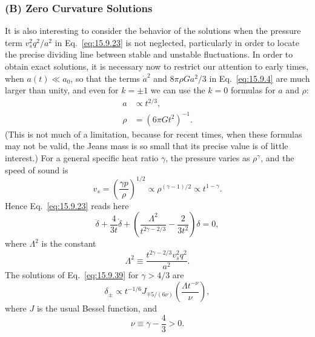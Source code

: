 \subsubsection*{(B) Zero Curvature Solutions}

It is also interesting to consider the behavior of the solutions when the
pressure term \(v_s^2q^2/a^2\) in Eq.~\eqref{eq:15.9.23} is not neglected,
particularly in order to locate the precise dividing line between stable and
unstable fluctuations. In order to obtain exact solutions, it is necessary now
to restrict our attention to early times, when \(a(t)\ll a_0\), so that the
terms \(\dot a^2\) and \(8\pi\rho Ga^2/3\) in Eq.~\eqref{eq:15.9.4} are
much larger than unity, and even for \(k=\pm1\) we can use the \(k=0\)
formulas for \(a\) and \(\rho\):
\begin{align}
  a&\propto t^{2/3},
  \tag{15.9.36}\label{eq:15.9.36}\\
  \rho&=(6\pi Gt^2)^{-1}.
  \tag{15.9.37}\label{eq:15.9.37}
\end{align}
(This is not much of a limitation, because for recent times, when these
formulas may not be valid, the Jeans mass is so small that its precise value is
of little interest.) For a general specific heat ratio \(\gamma\), the
pressure varies as \(\rho^\gamma\), and the speed of sound is
\begin{equation}
  v_s
  =
  \left(\frac{\gamma p}{\rho}\right)^{1/2}
  \propto\rho^{(\gamma-1)/2}
  \propto t^{1-\gamma}.
  \tag{15.9.38}\label{eq:15.9.38}
\end{equation}
Hence Eq.~\eqref{eq:15.9.23} reads here
\begin{equation}
  \ddot\delta
  +\frac4{3t}\dot\delta
  +\left(
    \frac{\Lambda^2}{t^{2\gamma-2/3}}
    -\frac2{3t^2}
  \right)\delta
  =0,
  \tag{15.9.39}\label{eq:15.9.39}
\end{equation}
where \(\Lambda^2\) is the constant
\begin{equation}
  \Lambda^2
  \equiv
  \frac{t^{2\gamma-2/3}v_s^2q^2}{a^2}.
  \tag{15.9.40}\label{eq:15.9.40}
\end{equation}
The solutions of Eq.~\eqref{eq:15.9.39} for \(\gamma>4/3\) are
\begin{equation}
  \delta_\pm
  \propto
  t^{-1/6}
  J_{\mp5/(6\nu)}
  \left(\frac{\Lambda t^{-\nu}}{\nu}\right),
  \tag{15.9.41}\label{eq:15.9.41}
\end{equation}
where \(J\) is the usual Bessel function, and
\begin{equation}
  \nu\equiv\gamma-\frac43>0.
  \tag{15.9.42}\label{eq:15.9.42}
\end{equation}
